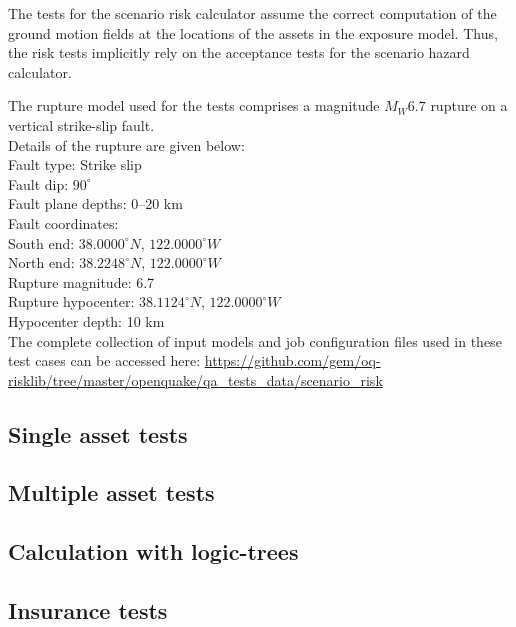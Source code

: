 The tests for the scenario risk calculator assume the correct computation of the ground motion fields at the locations of the assets in the exposure model. Thus, the risk tests implicitly rely on the acceptance tests for the scenario hazard calculator.

The rupture model used for the tests comprises a magnitude $M_W 6.7$ rupture on a vertical strike-slip fault.\\

\noindent Details of the rupture are given below:\\

\noindent
Fault type: Strike slip\\
Fault dip: $90^{\circ}$\\
Fault plane depths: 0--20 km\\
Fault coordinates:\\
South end: $38.0000^{\circ} N$, $122.0000^{\circ} W$\\
North end: $38.2248^{\circ} N$, $122.0000^{\circ} W$\\
Rupture magnitude: 6.7\\
Rupture hypocenter: $38.1124^{\circ} N$, $122.0000^{\circ} W$\\
Hypocenter depth: 10 km\\

The complete collection of input models and job configuration files used in these test cases can be accessed here:
\href{https://github.com/gem/oq-risklib/tree/master/openquake/qa_tests_data/scenario_risk}
{https://github.com/gem/oq-risklib/tree/master/openquake/qa\_tests\_data/scenario\_risk}

\subsection{Single asset tests}
\label{subsec:acc-sr-single}


\subsection{Multiple asset tests}
\label{subsec:acc-sr-multiple}


\subsection{Calculation with logic-trees}
\label{subsec:acc-sr-lt}


\subsection{Insurance tests}
\label{subsec:acc-sr-insurance}
